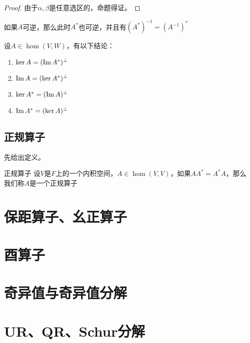 \documentclass[12pt, a4paper, oneside, UTF8]{ctexbook}
\begin{document}
\begin{para}{0}
\begin{proof}
						由于$\alpha ,\beta $是任意选区的，命题得证。
					\end{proof}
				\point{}
					\begin{proposition}
						如果$A$可逆，那么此时$A^*$也可逆，并且有$(A^*)^{-1}=(A^{-1})^*$
					\end{proposition}
				\point{}
					\begin{proposition}
						设$A\in \hom(V,W)$，有以下结论：
						\begin{enumerate}
							\item $\ker A = (\operatorname{Im} A^*)^{\perp}$
							\item $\operatorname{Im} A = (\ker A^*)^{\perp}$
							\item $\ker A^* = (\operatorname{Im} A)^{\perp}$
							\item $\operatorname{Im} A^* = (\ker A)^{\perp}$
						\end{enumerate}
					\end{proposition}
			\end{para}
		\subsection{正规算子}
			先给出定义。
			\begin{defn}{正规算子}{}
				设$V$是$F$上的一个内积空间，$A \in \hom(V,V)$，如果$AA^*=A^*A$，那么我们称$A$是一个正规算子
			\end{defn}
	\section{保距算子、幺正算子}
	\section{酉算子}
	\section{奇异值与奇异值分解}
	\section{UR、QR、Schur分解}
\ifx\allfiles\undefined
\end{document}
